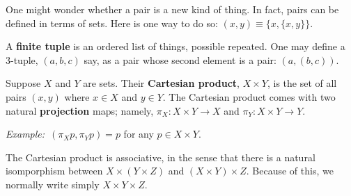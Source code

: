 \documentclass[10pt, a4paper, twocolumn]{article}
\newcommand{\defn}[1]{\textbf{#1}}
\newcommand{\eg}{\emph{Example:}\relax}
\begin{document}
One might wonder whether a pair is a new kind of thing. In fact, pairs can be
defined in terms of sets. Here is one way to do so: $(x, y)\equiv \{x, \{x,y\}\}$.

A \defn{finite tuple} is an ordered list of things, possible repeated. One may
define a 3-tuple, $(a, b, c)$ say, as a pair whose second element is a pair:
$(a, (b, c))$. 

Suppose $X$ and $Y$ are sets. Their \defn{Cartesian product}, $X \times Y$, is the
set of all pairs $(x, y)$ where $x \in X$ and $y \in Y$. The Cartesian product comes
with two natural \defn{projection} maps; namely, $\pi_X : X \times Y \to X$ and $\pi_Y : X
\times Y \to Y$.

\eg\ $(\pi_X p, \pi_Y p) = p$ for any $p \in X \times Y$.

The Cartesian product is associative, in the sense that there is a natural
isomporphism between $X \times (Y \times Z)$ and $(X \times Y) \times Z$. Because of this, we
normally write simply $X \times Y \times Z$.
\end{document}
